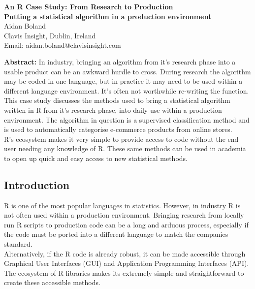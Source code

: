 \documentclass[12pt,a4paper]{article}
\begin{document}
\begin{center}

	\large \textbf{An R Case Study: From Research to Production\\ {\normalsize Putting a statistical algorithm in a production environment}}\\[12pt]

	\normalsize Aidan Boland\\[12pt]
	Clavis Insight, Dublin, Ireland\\ 
	Email: aidan.boland@clavisinsight.com\\[24pt]
	
\end{center}

\small \textbf{Abstract:}
In industry, bringing an algorithm from it's research phase into a usable product can be an awkward hurdle to cross. During research the algorithm may be coded in one language, but in practice it may need to be used within a different language environment. It's often not worthwhile re-writing the function.\\
This case study discusses the methods used to bring a statistical algorithm written in R from it's research phase, into daily use within a production environment. The algorithm in question is a supervised classification method and is used to automatically categorise e-commerce products from online stores.\\
R's ecosystem makes it very simple to provide access to code without the end user needing any knowledge of R. These same methods can be used in academia to open up quick and easy access to new statistical methods.


\normalsize
\subsection*{Introduction}

R is one of the most popular languages in statistics. However, in industry R is not often used within a production environment. Bringing research from locally run R scripts to production code can be a long and arduous process, especially if the code must be ported into a different language to match the companies standard.\\
Alternatively, if the R code is already robust, it can be made accessible through Graphical User Interfaces (GUI) and Application Programming Interfaces (API). The ecosystem of R libraries makes its extremely simple and straightforward to create these accessible methods.
\end{document}
